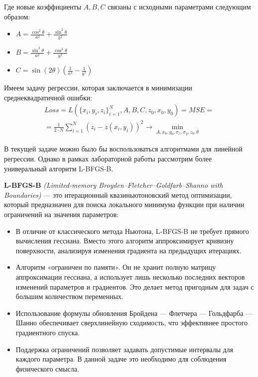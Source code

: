 Где новые коэффициенты $A, B, C$ связаны с исходными параметрами следующим образом:
\begin{itemize}
    \item $A = \frac{\cos^2\theta}{a^2} + \frac{\sin^2\theta}{b^2}$
    \item $B = \frac{\sin^2\theta}{a^2} + \frac{\cos^2\theta}{b^2}$
    \item $C = \sin(2\theta) \left( \frac{1}{a^2} - \frac{1}{b^2} \right)$
\end{itemize}

Имеем задачу регрессии, которая заключается в минимизации среднеквадратичной ошибки:
\[
\begin{gathered}
  Loss = L(\{x_i,y_i,z_i\}^N_{i=1},A,B,C,z_0,x_0,y_0) = MSE = \\
  =\frac{1}{2\cdot N} \sum_{i=1}^{N} (z_i - z(x_i,y_i))^2 \to \min_{A,x_0,y_0,\sigma_x,\sigma_y,z_0,\theta}
\end{gathered}
\]

В текущей задаче можно было бы воспользоваться алгоритмами для линейной регрессии. Однако в рамках лабораторной работы рассмотрим более универальный алгоритм L-BFGS-B.

\textbf{L-BFGS-B} \textit{(Limited-memory Broyden–Fletcher–Goldfarb–Shanno with Boundaries)} --- это итерационный квазиньютоновский метод оптимизации, который предназначен для поиска локального минимума функции при наличии ограничений на значения параметров:

\begin{itemize}
    \item В отличие от классического метода Ньютона, L-BFGS-B не требует прямого вычисления гессиана. Вместо этого алгоритм аппроксимирует кривизну поверхности, анализируя изменения градиента на предыдущих итерациях.
    \item Алгоритм «ограничен по памяти». Он не хранит полную матрицу аппроксимации гессиана, а использует лишь несколько последних векторов изменений параметров и градиентов. Это делает метод пригодным для задач с большим количеством переменных.
    \item Использование формулы обновления Бройдена --- Флетчера --- Гольдфарба --- Шанно обеспечивает сверхлинейную сходимость, что эффективнее простого градиентного спуска.
    \item Поддержка ограничений позволяет задавать допустимые интервалы для каждого параметра. В данной задаче это необходимо для соблюдения физического смысла.
\end{itemize}

